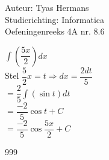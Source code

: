 \documentclass[a4paper]{article}
\begin{document}
  
\noindent \large Auteur: Tyas Hermans \\
\noindent \large Studierichting: Informatica\\
\noindent \large Oefeningenreeks 4A nr. 8.6\\

\medskip

\normalsize

$\displaystyle\int\left(\dfrac{5x}{2}\right)dx$\\

Stel $\dfrac{5}{2}x = t\Rightarrow dx = \dfrac{2dt}{5}$\\

$= \dfrac{2}{5}\displaystyle\int(\sin t) dt$\\

$= \dfrac{-2}{5}\cos t + C$\\

$= \dfrac{-2}{5}\cos \dfrac{5x}{2} + C$\\


\begin{thebibliography}{999}
\end{thebibliography}
\end{document}
